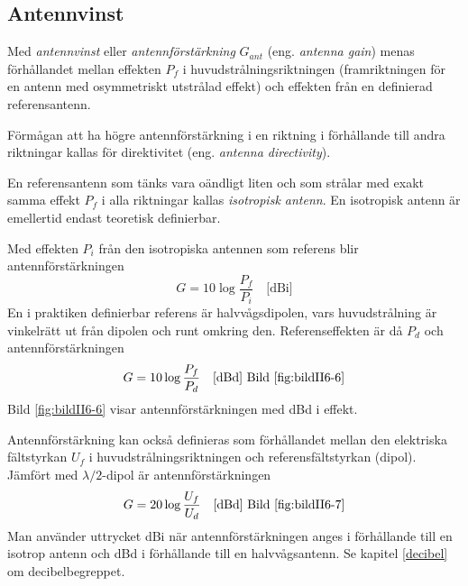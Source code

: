 \subsection{Antennvinst}
\label{antenner_antennvins}

Med \emph{antennvinst} eller \emph{antennförstärkning} \(G_{ant}\) (eng.
\emph{antenna gain}) menas förhållandet mellan effekten \(P_f\) i
huvudstrålningsriktningen (framriktningen för en antenn med osymmetriskt
utstrålad effekt) och effekten från en definierad referensantenn.

Förmågan att ha högre antennförstärkning i en riktning i förhållande till andra
riktningar kallas för direktivitet (eng. \emph{antenna directivity}).

En referensantenn som tänks vara oändligt liten och som strålar med exakt
samma effekt \(P_f\) i alla riktningar kallas \emph{isotropisk antenn}.
En isotropisk antenn är emellertid endast teoretisk definierbar.

Med effekten \(P_i\) från den isotropiska antennen som referens blir
antennförstärkningen
\[G = 10 \log\frac{P_f}{P_i} \quad \text{[dBi]}\]
En i praktiken definierbar referens är halvvågsdipolen, vars
huvudstrålning är vinkelrätt ut från dipolen och runt omkring den.
Referenseffekten är då \(P_d\) och antennförstärkningen
\[G = 10 \log\frac{P_f}{P_d} \quad \text{[dBd] Bild \ref{fig:bildII6-6}}\]
Bild \ref{fig:bildII6-6} visar antennförstärkningen med dBd i effekt.



Antennförstärkning kan också definieras som förhållandet mellan den elektriska
fältstyrkan \(U_f\) i huvudstrålningsriktningen och referensfältstyrkan (dipol).
Jämfört med \(\lambda/2\)-dipol är antennförstärkningen
\[G = 20 \log\frac{U_f}{U_d} \quad \text{[dBd] Bild \ref{fig:bildII6-7}}\]
Man använder uttrycket dBi när antennförstärkningen anges i förhållande till
en isotrop antenn och dBd i förhållande till en halvvågsantenn.
Se kapitel \ref{decibel} om decibelbegreppet.

